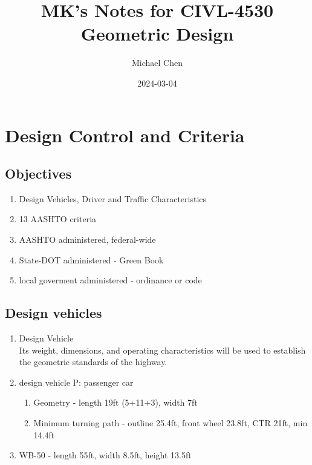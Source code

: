 \documentclass{article}
\title{MK's Notes for CIVL-4530 Geometric Design}
\date{2024-03-04}
\author{Michael Chen}
\begin{document}




  \section{Design Control and Criteria}
  \subsection{Objectives}
  \begin{enumerate}
    \item Design Vehicles, Driver and Traffic Characteristics
    \item 13 AASHTO criteria
    \item AASHTO administered, federal-wide
    \item State-DOT administered - Green Book
    \item local goverment administered - ordinance or code
  \end{enumerate}

  \subsection{Design vehicles}
  \begin{enumerate}
    \item Design Vehicle\\ 
    Its weight, dimensions, and operating characteristics will be used to establish the geometric standards of the highway.
    \item design vehicle P: passenger car
    \begin{enumerate}
      \item Geometry - length 19ft (5+11+3), width 7ft
      \item Minimum turning path - outline 25.4ft, front wheel 23.8ft, CTR 21ft, min 14.4ft 
    \end{enumerate}
    \item WB-50 - length 55ft, width 8.5ft, height 13.5ft
  \end{enumerate}
\end{document}
